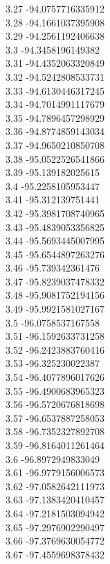 {3.27	-94.0757716335912\\
3.28	-94.1661037395908\\
3.29	-94.2561192406638\\
3.3	-94.3458196149382\\
3.31	-94.4352063320849\\
3.32	-94.5242808533731\\
3.33	-94.6130446317245\\
3.34	-94.7014991117679\\
3.35	-94.7896457298929\\
3.36	-94.8774859143034\\
3.37	-94.9650210850708\\
3.38	-95.0522526541866\\
3.39	-95.139182025615\\
3.4	-95.2258105953447\\
3.41	-95.312139751441\\
3.42	-95.3981708740965\\
3.43	-95.4839053356825\\
3.44	-95.5693445007995\\
3.45	-95.6544897263276\\
3.46	-95.739342361476\\
3.47	-95.8239037478332\\
3.48	-95.9081752194156\\
3.49	-95.9921581027167\\
3.5	-96.0758537167558\\
3.51	-96.1592633731258\\
3.52	-96.2423883760416\\
3.53	-96.325230022387\\
3.54	-96.4077896017626\\
3.55	-96.4900683965323\\
3.56	-96.5720676818698\\
3.57	-96.6537887258053\\
3.58	-96.7352327892708\\
3.59	-96.8164011261464\\
3.6	-96.8972949833049\\
3.61	-96.9779156006573\\
3.62	-97.0582642111973\\
3.63	-97.1383420410457\\
3.64	-97.2181503094942\\
3.65	-97.2976902290497\\
3.66	-97.3769630054772\\
3.67	-97.4559698378432\\
}
